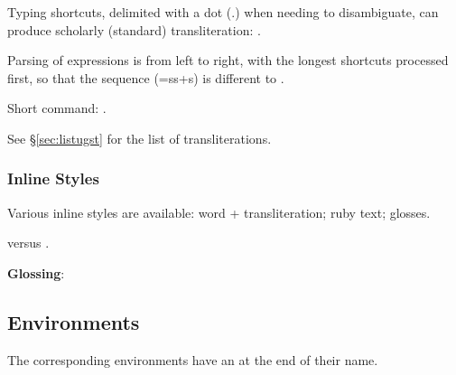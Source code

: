 \bigskip

Typing shortcuts, delimited with a dot (.) when needing to disambiguate,  can produce scholarly (standard) transliteration: .

Parsing of expressions is from left to right, with the longest shortcuts processed first, so that the sequence  (=ss+s) is different to .

Short command: .

See \S\ref{sec:listugst} for the list of transliterations.

\bigskip
\subsubsection{Inline Styles}
Various inline styles are available: word + transliteration; ruby text; glosses.


\noindent{} versus .


\bigskip
\textbf{Glossing}: 


\subsection{Environments}
The corresponding environments have an  at the end of their name.


